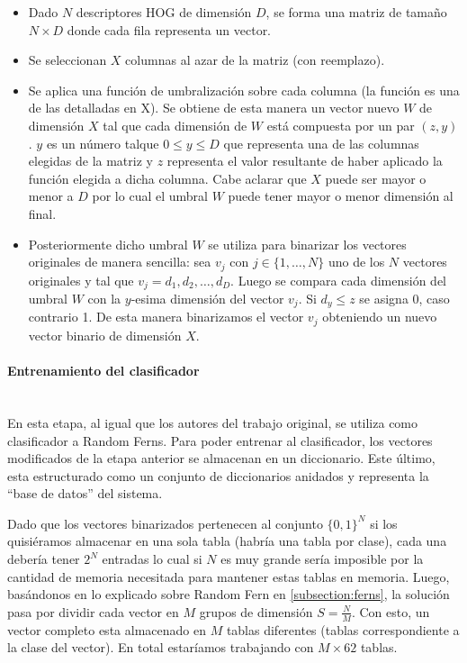 			\begin{itemize}
				\item Dado $N$ descriptores HOG de dimensión $D$, se forma una matriz de tamaño $N \times D$ donde cada fila representa un vector.
				\item Se seleccionan $X$ columnas al azar de la matriz (con reemplazo).
				\item Se aplica una función de umbralización sobre cada columna (la función es una de las detalladas en X). Se obtiene de esta manera un vector nuevo $W$ de dimensión $X$ tal que cada dimensión de $W$ está compuesta por un par $(z,y)$. $y$ es un número talque $0 \leq y \leq D$ que representa una de las columnas elegidas de la matriz y $z$ representa el valor resultante de haber aplicado la función elegida a dicha columna. Cabe aclarar que $X$ puede ser mayor o menor a $D$ por lo cual el umbral $W$ puede tener mayor o menor dimensión al final.
				\item Posteriormente dicho umbral $W$ se utiliza para binarizar los vectores originales de manera sencilla: sea $v_j$ con $j \in \{1,\dots,N\}$ uno de los $N$ vectores originales y tal que $v_j = d_1,d_2,\dots,d_D$. Luego se compara cada dimensión del umbral $W$ con la $y$-esima dimensión del vector $v_j$. Si $d_y \leq z$ se asigna 0, caso contrario 1. De esta manera binarizamos el vector $v_j$ obteniendo un nuevo vector binario de dimensión $X$.
			
			\end{itemize}

		\paragraph{Entrenamiento del clasificador}  ~\\

			En esta etapa, al igual que los autores del trabajo original, se utiliza como clasificador a Random Ferns. Para poder entrenar al clasificador, los vectores modificados de la etapa anterior se almacenan en un diccionario. Este último, esta estructurado como un conjunto de diccionarios anidados y representa la ``base de datos'' del sistema.

			Dado que los vectores binarizados pertenecen al conjunto $\{ 0,1 \}^{N}$ si los quisiéramos almacenar en una sola tabla (habría una tabla por clase), cada una debería tener $2^{N}$ entradas lo cual si $N$ es muy grande sería imposible por la cantidad de memoria necesitada para mantener estas tablas en memoria. Luego, basándonos en lo explicado sobre Random Fern en \ref{subsection:ferns}, la solución pasa por dividir cada vector en $M$ grupos de dimensión $S = \frac{N}{M}$. Con esto, un vector completo esta almacenado en $M$ tablas diferentes (tablas correspondiente a la clase del vector). En total estaríamos trabajando con $M \times 62$ tablas.

